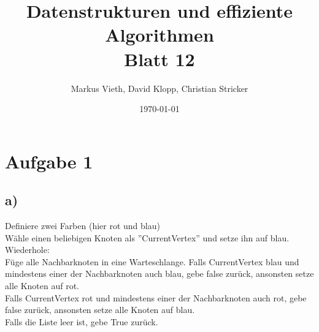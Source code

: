 \documentclass[a4paper,11pt,twoside]{scrartcl}
\title{Datenstrukturen und effiziente Algorithmen\\ Blatt 12}
\author{Markus Vieth, David Klopp, Christian Stricker}
\date{\today}
\begin{document}
\maketitle
\cleardoublepage
\pagestyle{myheadings}

\section*{Aufgabe 1}
 \subsection{a)} 
  Definiere zwei Farben (hier rot und blau)\\
  Wähle einen beliebigen Knoten als ''CurrentVertex'' und setze ihn auf blau.\\
  Wiederhole:\\
	  Füge alle Nachbarknoten in eine Warteschlange.
	  Falls CurrentVertex blau und mindestens einer der Nachbarknoten auch blau, gebe false zurück, ansonsten setze alle Knoten auf rot.\\
	  Falls CurrentVertex rot und mindestens einer der Nachbarknoten auch rot, gebe false zurück, ansonsten setze alle Knoten auf blau.\\
  Falls die Liste leer ist, gebe True zurück.
   
\end{document}
